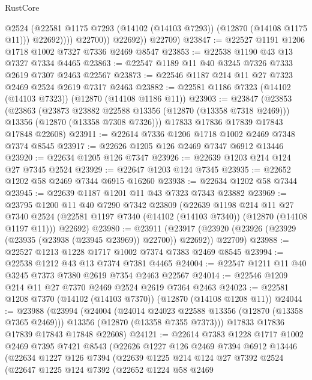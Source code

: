 \begin{lexlean}{RustCore}
\begin{coremodule}
                      @2524
                      (@22581 @1175 @7293 (@14102 (@14103 @7293)) (@12870 (@14108 @1175 @11)))
                      @22692))))
              @22700))
          @22692))
      @22709)
@23847 := @22527 @1191 @1206 @1718 @1002 @7327 @7336 @2469 @8547
@23853 := @22538 @1190 @43 @13 @7327 @7334 @4465
@23863 := @22547 @1189 @11 @40 @3245 @7326 @7333 @2619 @7307 @2463 @22567
@23873 := @22546 @1187 @214 @11 @27 @7323 @2469 @2524 @2619 @7317 @2463
@23882 := @22581 @1186 @7323 (@14102 (@14103 @7323)) (@12870 (@14108 @1186 @11))
@23903 := @23847
    (@23853
      (@23863
        (@23873 @23882 @22588 @13356 (@12870 (@13358 @7318 @2469)))
        @13356
        (@12870 (@13358 @7308 @7326)))
      @17833
      @17836
      @17839
      @17843
      @17848
      @22608)
@23911 := @22614 @7336 @1206 @1718 @1002 @2469 @7348 @7374 @8545
@23917 := @22626 @1205 @126 @2469 @7347 @6912 @13446
@23920 := @22634 @1205 @126 @7347
@23926 := @22639 @1203 @214 @124 @27 @7345 @2524
@23929 := @22647 @1203 @124 @7345
@23935 := @22652 @1202 @58 @2469 @7344 @6915 @16260
@23938 := @22634 @1202 @58 @7344
@23945 := @22639 @1187 @1201 @11 @43 @7323 @7343 @23882
@23969 := @23795
    @1200
    @11
    @40
    @7290
    @7342
    @23809
    (@22639
      @1198
      @214
      @11
      @27
      @7340
      @2524
      (@22581 @1197 @7340 (@14102 (@14103 @7340)) (@12870 (@14108 @1197 @11)))
      @22692)
@23980 := @23911
    (@23917 (@23920 (@23926 (@23929 (@23935 (@23938 (@23945 @23969)) @22700)) @22692)) @22709)
@23988 := @22527 @1213 @1228 @1717 @1002 @7374 @7383 @2469 @8545
@23994 := @22538 @1212 @43 @13 @7374 @7381 @4465
@24004 := @22547 @1211 @11 @40 @3245 @7373 @7380 @2619 @7354 @2463 @22567
@24014 := @22546 @1209 @214 @11 @27 @7370 @2469 @2524 @2619 @7364 @2463
@24023 := @22581 @1208 @7370 (@14102 (@14103 @7370)) (@12870 (@14108 @1208 @11))
@24044 := @23988
    (@23994
      (@24004
        (@24014 @24023 @22588 @13356 (@12870 (@13358 @7365 @2469)))
        @13356
        (@12870 (@13358 @7355 @7373)))
      @17833
      @17836
      @17839
      @17843
      @17848
      @22608)
@24121 := @22614
    @7383
    @1228
    @1717
    @1002
    @2469
    @7395
    @7421
    @8543
    (@22626
      @1227
      @126
      @2469
      @7394
      @6912
      @13446
      (@22634
        @1227
        @126
        @7394
        (@22639
          @1225
          @214
          @124
          @27
          @7392
          @2524
          (@22647
            @1225
            @124
            @7392
            (@22652
              @1224
              @58
              @2469

\end{coremodule}
\end{lexlean}
